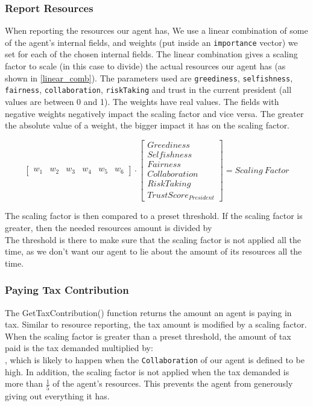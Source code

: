 \subsubsection{Report Resources}
When reporting the resources our agent has, We use a linear combination of some of the agent's internal fields, and weights (put inside an \texttt{importance} vector) we set for each of the chosen internal fields. The linear combination gives a scaling factor to scale (in this case to divide) the actual resources our agent has (as shown in \eqref{linear_comb}). The parameters used are \texttt{greediness}, \texttt{selfishness}, \texttt{fairness}, \texttt{collaboration}, \texttt{riskTaking} and trust in the current president (all values are between 0 and 1). The weights have real values. The fields with negative weights negatively impact the scaling factor and vice versa. The greater the absolute value of a weight, the bigger impact it has on the scaling factor.

\begin{equation}\label{linear_comb}
    \begin{bmatrix}
        w_{1}& w_{2}& w_{3}& w_{4}& w_{5}& w_{6}
    \end{bmatrix}
    \cdot
    \begin{bmatrix}
    Greediness \\ 
    Selfishness \\ 
    Fairness \\ 
    Collaboration \\ 
    RiskTaking \\
    TrustScore_{President}
    \end{bmatrix}
    = Scaling\:Factor
\end{equation}

The scaling factor is then compared to a preset threshold. If the scaling factor is greater, then the needed resources amount is divided by 
\begin{equation}
    [1 + (Scaling\:Factor - Preset\:Threshold)]
\end{equation} 
The threshold is there to make sure that the scaling factor is not applied all the time, as we don't want our agent to lie about the amount of its resources all the time.

\subsubsection{Paying Tax Contribution}
The GetTaxContribution() function returns the amount an agent is paying in tax. Similar to resource reporting, the tax amount is modified by a scaling factor. When the scaling factor is greater than a preset threshold, the amount of tax paid is the tax demanded multiplied by: 
\begin{equation}
    [1 + (Scaling \: Factor - Preset \: Threshold)]
\end{equation}
, which is likely to happen when the \texttt{Collaboration} of our agent is defined to be high. In addition, the scaling factor is not applied when the tax demanded is more than $\frac{1}{5}$ of the agent's resources. This prevents the agent from generously giving out everything it has.

